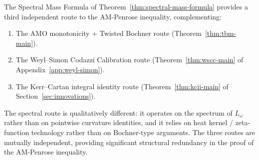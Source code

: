 \begin{remark}
The Spectral Mass Formula of Theorem~\ref{thm:spectral-mass-formula} provides a third independent route to the AM-Penrose inequality, complementing:
\begin{enumerate}
\item The AMO monotonicity + Twisted Bochner route (Theorem~\ref{thm:tbm-main}).
\item The Weyl--Simon Codazzi Calibration route (Theorem~\ref{thm:wscc-main} of Appendix~\ref{app:weyl-simon}).
\item The Kerr--Cartan integral identity route (Theorem~\ref{thm:kcii-main} of Section~\ref{sec:innovations}).
\end{enumerate}
The spectral route is qualitatively different: it operates on the spectrum of $L_\omega$ rather than on pointwise curvature identities, and it relies on heat kernel / zeta-function technology rather than on Bochner-type arguments. The three routes are mutually independent, providing significant structural redundancy in the proof of the AM-Penrose inequality.
\end{remark}

